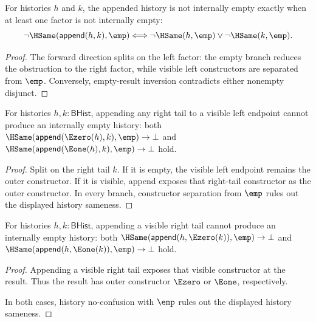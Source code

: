 \begin{theorem}
\label{thm:append-nonempty-iff}
For histories $h$ and $k$, the appended history is not internally empty
exactly when at least one factor is not internally empty:
$$
\neg\HSame(\mathsf{append}(h,k),\emp)
\Longleftrightarrow
\neg\HSame(h,\emp)\vee\neg\HSame(k,\emp).
$$
\end{theorem}
\begin{proof}
The forward direction splits on the left factor: the empty branch reduces the
obstruction to the right factor, while visible left constructors are separated
from $\emp$. Conversely, empty-result inversion contradicts either nonempty
disjunct.
\end{proof}

\begin{theorem}
\label{thm:append-visible-left-empty-absurd}
For histories $h,k:\mathsf{BHist}$, appending any right tail to a visible left endpoint cannot produce an internally empty history:
both $\HSame(\mathsf{append}(\Ezero(h),k),\emp)\to\bot$ and $\HSame(\mathsf{append}(\Eone(h),k),\emp)\to\bot$ hold.
\end{theorem}
\begin{proof}
Split on the right tail $k$. If it is empty, the visible left endpoint remains
the outer constructor. If it is visible, append exposes that right-tail
constructor as the outer constructor. In every branch, constructor separation
from $\emp$ rules out the displayed history sameness.
\end{proof}

\begin{theorem}
\label{thm:append-visible-right-empty-absurd}
For histories $h,k:\mathsf{BHist}$, appending a visible right tail cannot produce an internally empty history:
both $\HSame(\mathsf{append}(h,\Ezero(k)),\emp)\to\bot$ and $\HSame(\mathsf{append}(h,\Eone(k)),\emp)\to\bot$ hold.
\end{theorem}
\begin{proof}
Appending a visible right tail exposes that visible constructor at the result.
Thus the result has outer constructor $\Ezero$ or $\Eone$, respectively.

In both cases, history no-confusion with $\emp$ rules out the displayed
history sameness.
\end{proof}

